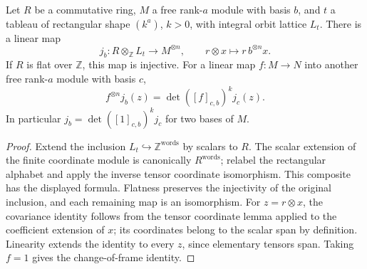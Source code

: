 \begin{lemma}
\label{lem:free-integral-tensor-embedding}
\leanok
Let $R$ be a commutative ring, $M$ a free rank-$a$ module with basis $b$,
and $t$ a tableau of rectangular shape $(k^a)$, $k>0$, with integral orbit
lattice $L_t$. There is a linear map
\[
 j_b:R\otimes_{\mathbb Z}L_t\longrightarrow M^{\otimes n},\qquad
 r\otimes x\longmapsto r\,b^{\otimes n}x.
\]
If $R$ is flat over $\mathbb Z$, this map is injective.
For a linear map $f:M\to N$ into another free rank-$a$ module with basis $c$,
\[
 f^{\otimes n}j_b(z)=\det([f]_{c,b})^k j_c(z).
\]
In particular $j_b=\det([1]_{c,b})^k j_c$ for two bases of $M$.
\end{lemma}
\begin{proof}
Extend the inclusion $L_t\hookrightarrow\mathbb Z^{\mathrm{words}}$
by scalars to $R$. The scalar extension of the finite coordinate module
is canonically $R^{\mathrm{words}}$; relabel the rectangular alphabet
and apply the inverse tensor coordinate isomorphism. This composite
has the displayed formula. Flatness preserves the injectivity of the
original inclusion, and each remaining map is an isomorphism.
For $z=r\otimes x$, the covariance identity follows from the tensor
coordinate lemma applied to the coefficient extension of $x$; its
coordinates belong to the scalar span by definition. Linearity extends
the identity to every $z$, since elementary tensors span. Taking $f=1$
gives the change-of-frame identity.
\end{proof}

